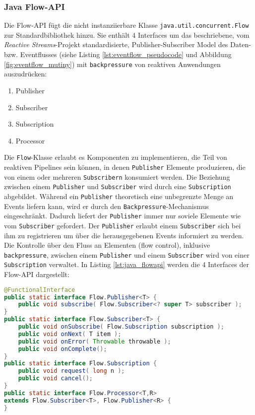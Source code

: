 \subsubsection{Java Flow-API}
\label{subsection:java_flow_api}
Die Flow-API fügt die nicht instanziierbare Klasse \verb|java.util.concurrent.Flow| zur Standardbibliothek hinzu. Sie enthält 4 Interfaces um das beschriebene,
vom \textit{Reactive Streams}-Projekt standardisierte, Publisher-Subscriber Model des Daten- bzw. Eventflusses
(siehe Listing \ref{lst:eventflow_pseudocode} und Abbildung \ref{fig:eventflow_mutiny}) mit \verb|backpressure|
von reaktiven Anwendungen auszudrücken:
\begin{enumerate}
  \item Publisher
  \item Subscriber
  \item Subscription
  \item Processor
\end{enumerate}

Die \verb|Flow|-Klasse erlaubt es Komponenten zu implementieren, die Teil von reaktiven Pipelines sein können, in denen
\verb|Publisher| Elemente produzieren, die von einem oder mehreren \verb|Subscribern| konsumiert werden.
Die Beziehung zwischen einem \verb|Publisher| und \verb|Subscriber| wird durch eine \verb|Subscription| abgebildet.
Während ein \verb|Publisher| theoretisch eine unbegrenzte Menge an Events liefern kann, wird er durch den \verb|Backpressure|-Mechanismus eingeschränkt.
Dadurch liefert der \verb|Publisher| immer nur soviele Elemente wie vom \verb|Subscriber| gefordert.
Der \verb|Publisher| erlaubt einem \verb|Subscriber| sich bei ihm zu registrieren um über die herausgegebenen Events informiert zu werden.
Die Kontrolle über den Fluss an Elementen (flow control), inklusive \verb|backpressure|, zwischen einem \verb|Publisher| und einem \verb|Subscriber|
wird von einer \verb|Subscription| verwaltet.
In Listing \ref{lst:java_flowapi} werden die 4 Interfaces der Flow-API dargestellt:
\begin{lstlisting}[language=java, caption=Die Klasse java.util.concurrent.Flow, captionpos=b, label=lst:java_flowapi]
@FunctionalInterface
public static interface Flow.Publisher<T> {
	public void subscribe( Flow.Subscriber<? super T> subscriber );
}
public static interface Flow.Subscriber<T> {
	public void onSubscribe( Flow.Subscription subscription );
	public void onNext( T item );
	public void onError( Throwable throwable );
	public void onComplete();
}
public static interface Flow.Subscription {
	public void request( long n );
	public void cancel();
}
public static interface Flow.Processor<T,R>
extends Flow.Subscriber<T>, Flow.Publisher<R> {
}
\end{lstlisting}\parencite[Kapitel 5.11]{JavaSE9StandardBibliothek}

